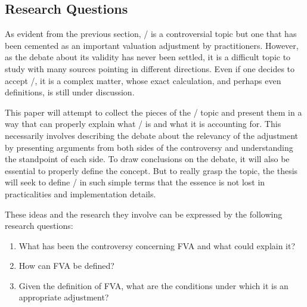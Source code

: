 \documentclass[main.tex]{subfiles}
\begin{document}
    \subsection{Research Questions}
        
    As evident from the previous section, \FVA/ is a controversial topic 
    but one that has been cemented as an important valuation adjustment by practitioners.
    However, as the debate about its validity has never been settled,
    it is a difficult topic to study with many sources pointing in different directions.
    Even if one decides to accept \FVA/, it is a complex matter,
    whose exact calculation, and perhaps even definitions, is still under discussion.

    This paper will attempt to collect the pieces of the \FVA/ topic
    and present them in a way that can properly explain what \FVA/ is and what it is accounting for.
    This necessarily involves describing the debate about the relevancy of the adjustment
    by presenting arguments from both sides of the controversy 
    and understanding the standpoint of each side.
    To draw conclusions on the debate, it will also be essential to properly define the concept.
    But to really grasp the topic, the thesis will seek to define \FVA/ in such simple terms 
    that the essence is not lost in practicalities and implementation details.

    These ideas and the research they involve can be expressed by the following research questions:
    \begin{enumerate}
        \item What has been the controversy concerning FVA and what could explain it?
        \item How can FVA be defined?
        \item Given the definition of FVA, 
              what are the conditions under which it is an appropriate adjustment?
    \end{enumerate}
\end{document}
